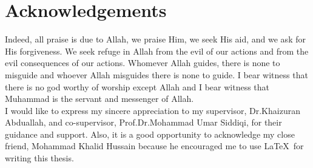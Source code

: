 \chapter*{Acknowledgements}
{ \begin{singlespace}  
Indeed, all praise is due to Allah, we praise Him, we seek His aid, and we ask for His forgiveness.
We seek refuge in Allah from the evil of our actions and from the evil consequences of our
actions. Whomever Allah guides, there is none to misguide and whoever Allah misguides there is
none to guide. I bear witness that there is no god worthy of worship except Allah and I bear
witness that Muhammad is the servant and messenger of Allah.
\\[12pt] I would like to express my sincere appreciation to my supervisor, Dr.Khaizuran Abduallah,  and co-supervisor, Prof.Dr.Mohammad Umar Siddiqi, for their guidance and support. Also, it is a good opportunity to acknowledge my close friend, Mohammad Khalid Hussain because he encouraged me to use \LaTeX~for writing this thesis.\end{singlespace} }
